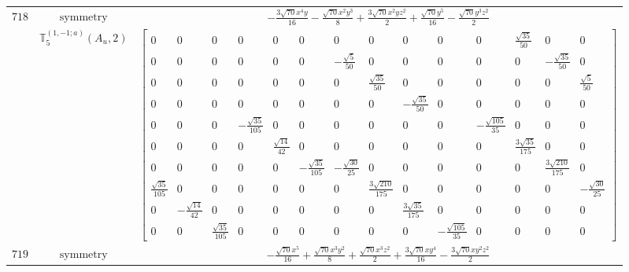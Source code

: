 \documentclass[fleqn,8pt,landscape]{jsarticle}
\begin{document}
\begin{longtable}{ccc}
$ 718 $ & $ \text{symmetry} $ & $ - \frac{3 \sqrt{70} x^{4} y}{16} - \frac{\sqrt{70} x^{2} y^{3}}{8} + \frac{3 \sqrt{70} x^{2} y z^{2}}{2} + \frac{\sqrt{70} y^{5}}{16} - \frac{\sqrt{70} y^{3} z^{2}}{2} $ \\
$  $ & $ \mathbb{T}_{5}^{(1,-1;a)}(A_{u},2) $ & $ \begin{bmatrix} 0 & 0 & 0 & 0 & 0 & 0 & 0 & 0 & 0 & 0 & 0 & \frac{\sqrt{35}}{50} & 0 & 0 \\ 0 & 0 & 0 & 0 & 0 & 0 & - \frac{\sqrt{5}}{50} & 0 & 0 & 0 & 0 & 0 & - \frac{\sqrt{35}}{50} & 0 \\ 0 & 0 & 0 & 0 & 0 & 0 & 0 & \frac{\sqrt{35}}{50} & 0 & 0 & 0 & 0 & 0 & \frac{\sqrt{5}}{50} \\ 0 & 0 & 0 & 0 & 0 & 0 & 0 & 0 & - \frac{\sqrt{35}}{50} & 0 & 0 & 0 & 0 & 0 \\ 0 & 0 & 0 & - \frac{\sqrt{35}}{105} & 0 & 0 & 0 & 0 & 0 & 0 & - \frac{\sqrt{105}}{35} & 0 & 0 & 0 \\ 0 & 0 & 0 & 0 & \frac{\sqrt{14}}{42} & 0 & 0 & 0 & 0 & 0 & 0 & \frac{3 \sqrt{35}}{175} & 0 & 0 \\ 0 & 0 & 0 & 0 & 0 & - \frac{\sqrt{35}}{105} & - \frac{\sqrt{30}}{25} & 0 & 0 & 0 & 0 & 0 & \frac{3 \sqrt{210}}{175} & 0 \\ \frac{\sqrt{35}}{105} & 0 & 0 & 0 & 0 & 0 & 0 & \frac{3 \sqrt{210}}{175} & 0 & 0 & 0 & 0 & 0 & - \frac{\sqrt{30}}{25} \\ 0 & - \frac{\sqrt{14}}{42} & 0 & 0 & 0 & 0 & 0 & 0 & \frac{3 \sqrt{35}}{175} & 0 & 0 & 0 & 0 & 0 \\ 0 & 0 & \frac{\sqrt{35}}{105} & 0 & 0 & 0 & 0 & 0 & 0 & - \frac{\sqrt{105}}{35} & 0 & 0 & 0 & 0 \end{bmatrix} $ \\ \hline
$ 719 $ & $ \text{symmetry} $ & $ - \frac{\sqrt{70} x^{5}}{16} + \frac{\sqrt{70} x^{3} y^{2}}{8} + \frac{\sqrt{70} x^{3} z^{2}}{2} + \frac{3 \sqrt{70} x y^{4}}{16} - \frac{3 \sqrt{70} x y^{2} z^{2}}{2} $ \\

\end{longtable}
\end{document}
